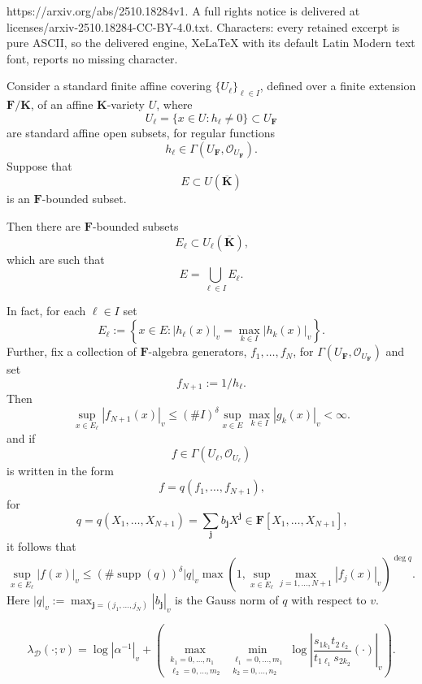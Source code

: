 \documentclass[10pt,a4paper]{amsart}
\newcommand{\FF}{\mathbf{F}}
\newcommand{\KK}{\mathbf{K}}
\newcommand{\Osh}{{\mathcal O}}                        %
\renewcommand{\leq}{\leqslant}
\begin{document}
https://arxiv.org/abs/2510.18284v1. A full rights notice is delivered at licenses/arxiv-2510.18284-CC-BY-4.0.txt. Characters: every retained excerpt is pure ASCII, so the delivered engine, XeLaTeX with its default Latin Modern text font, reports no missing character.
\begin{lemma}\label{effective:Hilb:Null:lemma:2}   Consider a standard finite affine covering $\{U_\ell\}_{\ell \in I}$, defined over a finite extension $\FF / \KK$, of an affine $\KK$-variety $U$, where 
$$
U_{\ell} = \{x \in U : h_\ell \not = 0 \} \subset U_{\FF}
$$ 
are standard affine open subsets, for regular functions 
$$h_\ell \in \Gamma(U_{\FF},\Osh_{U_{\FF}}) \text{.}$$  
Suppose that 
$$E \subset U(\overline{\KK})$$ 
is an $\FF$-bounded subset.  

Then there are $\FF$-bounded subsets 
$$E_\ell \subset U_\ell(\overline{\KK})\text{,}$$ 
which are such that 
$$E = \bigcup_{\ell \in I} E_\ell\text{.}$$  

In fact, for each $\ell \in I$ set
$$
E_\ell := \left\{x \in E : |h_\ell(x)|_v = \max_{k \in I} |h_k(x)|_v \right\} \text{.}
$$
Further,
 fix a collection of $\FF$-algebra generators, $f_1,\dots,f_N$, for $\Gamma(U_{\FF},\Osh_{U_{\FF}})$ and set 
$$f_{N+1} := 1 / h_\ell \text{.}$$  
Then
$$
\sup_{x \in E_{\ell}} \left| f_{N+1} (x) \right|_v \leq (\# I)^\delta \sup_{x \in E} \max_{k \in I} |g_k(x)|_v < \infty \text{.}
$$
and if 
$$
f \in \Gamma(U_{\ell},\Osh_{U_{\ell}})
$$
is written in the form
$$
f = q(f_1,\dots,f_{N+1}) \text{,}
$$
for 
$$
q = q(X_1,\dots,X_{N+1}) = \sum_{\mathbf{j}} b_{\mathbf{j}} X^{\mathbf{j}} \in \FF[X_1,\dots,X_{N+1}] \text{,}
$$
it follows that 
$$
\sup_{x \in E_{\ell}} | f(x)|_v \leq (\# \operatorname{supp}(q))^{\delta} |q|_v \max \left(1,\sup_{x \in E_{\ell}} \max_{j=1,\dots,N+1} |f_j(x)|_v \right)^{\deg q} \text{.}
$$
Here $|q|_v := \max_{\mathbf{j} = (j_1,\dots,j_N)} |b_{\mathbf{j}}|_v $ is the Gauss norm of $q$ with respect to $v$.
\end{lemma}

\begin{equation}\label{motivational:local:Weil:Function:Calculation}
\lambda_{\mathcal{D}}(\cdot;v) = \log |\alpha^{-1}|_v + \left( \max_{\substack{k_1 = 0,\dots,n_1 \\
\ell_2 = 0,\dots,m_2}} \min_{\substack{\ell_1 = 0,\dots,m_1 \\ k_2 = 0,\dots,n_2}} \log \left| \frac{s_{1 {k_1}} t_{2 {\ell_2}}  }{  t_{1 {\ell_1}} s_{2 {k_2}}  }(\cdot) \right|_v \right) \text{.}
\end{equation}
\end{document}
